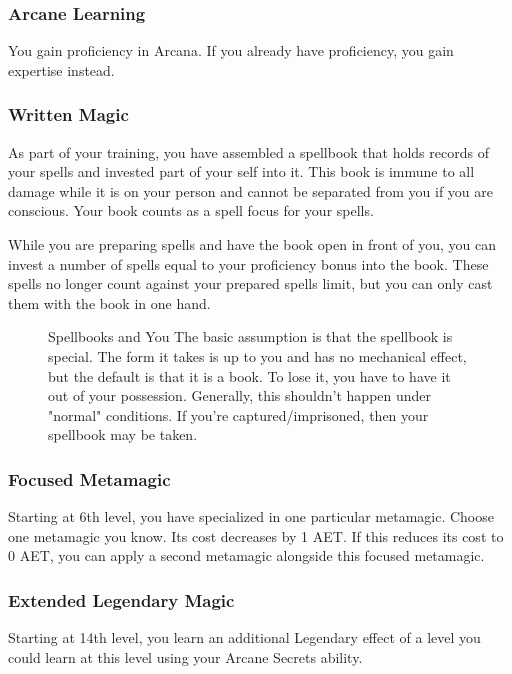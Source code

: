 \subsubsection{Arcane Learning}
You gain proficiency in Arcana. If you already have proficiency, you gain expertise instead.

\subsubsection{Written Magic}
As part of your training, you have assembled a spellbook that holds records of your spells and invested part of your self into it. This book is immune to all damage while it is on your person and cannot be separated from you if you are conscious. Your book counts as a spell focus for your spells.

While you are preparing spells and have the book open in front of you, you can invest a number of spells equal to your proficiency bonus into the book. These spells no longer count against your prepared spells limit, but you can only cast them with the book in one hand.

\begin{figure}
	\begin{DndComment}{Spellbooks and You}
		The basic assumption is that the spellbook is special. The form it takes is up to you and has no mechanical effect, but the default is that it is a book. To lose it, you have to have it out of your possession. Generally, this shouldn't happen under "normal" conditions. If you're captured/imprisoned, then your spellbook may be taken.
	\end{DndComment}
\end{figure}

\subsubsection{Focused Metamagic}
Starting at 6th level, you have specialized in one particular metamagic. Choose one metamagic you know. Its cost decreases by 1 AET. If this reduces its cost to 0 AET, you can apply a second metamagic alongside this focused metamagic.

\subsubsection{Extended Legendary Magic}
Starting at 14th level, you learn an additional Legendary effect of a level you could learn at this level using your Arcane Secrets ability.

